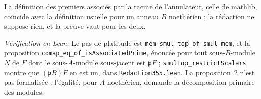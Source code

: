 \noindent La définition des premiers associés par la racine de l'annulateur, celle de mathlib, coïncide avec la définition usuelle pour un anneau $B$ noethérien ; la rédaction ne suppose rien, et la preuve vaut pour les deux.

\begin{sloppypar}
\noindent\emph{Vérification en Lean.} Le pas de platitude est \texttt{mem\_smul\_top\_of\_smul\_mem}, et la proposition \texttt{comap\_eq\_of\_isAssociatedPrime}, énoncée pour tout sous-$B$-module $N$ de $F$ dont le sous-$A$-module sous-jacent est $\mathfrak pF$ ; \texttt{smulTop\_restrictScalars} montre que $(\mathfrak pB)F$ en est un, dans \href{\leanblobmain/Redaction355.lean}{\texttt{Redaction355.\allowbreak{}lean}}. La proposition~2 n'est pas formalisée : l'égalité, pour $A$ noethérien, demande la décomposition primaire des modules.
\end{sloppypar}

